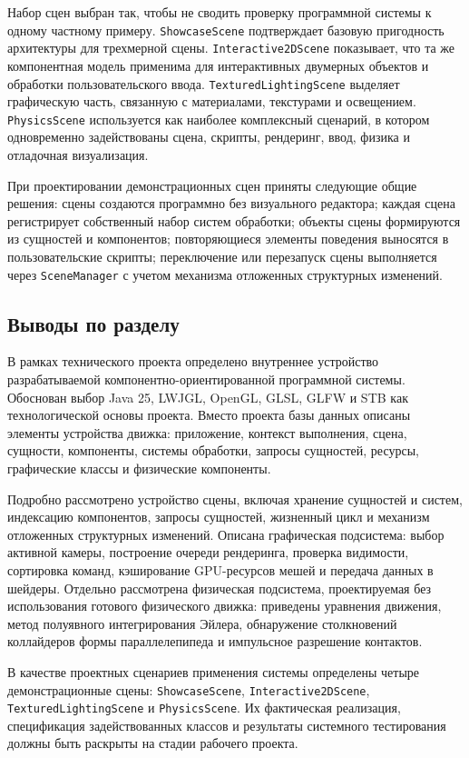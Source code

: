 Набор сцен выбран так, чтобы не сводить проверку программной системы к одному
частному примеру. \texttt{ShowcaseScene} подтверждает базовую пригодность
архитектуры для трехмерной сцены. \texttt{Interactive2DScene} показывает, что
та же компонентная модель применима для интерактивных двумерных объектов и
обработки пользовательского ввода. \texttt{TexturedLightingScene} выделяет
графическую часть, связанную с материалами, текстурами и освещением.
\texttt{PhysicsScene} используется как наиболее комплексный сценарий, в котором
одновременно задействованы сцена, скрипты, рендеринг, ввод, физика и отладочная
визуализация.

При проектировании демонстрационных сцен приняты следующие общие решения:
сцены создаются программно без визуального редактора; каждая сцена регистрирует
собственный набор систем обработки; объекты сцены формируются из сущностей и
компонентов; повторяющиеся элементы поведения выносятся в пользовательские
скрипты; переключение или перезапуск сцены выполняется через \texttt{SceneManager}
с учетом механизма отложенных структурных изменений.

\subsection{Выводы по разделу}

В рамках технического проекта определено внутреннее устройство разрабатываемой
компонентно-ориентированной программной системы. Обоснован выбор Java 25,
LWJGL, OpenGL, GLSL, GLFW и STB как технологической основы проекта. Вместо
проекта базы данных описаны элементы устройства движка: приложение, контекст
выполнения, сцена, сущности, компоненты, системы обработки, запросы сущностей,
ресурсы, графические классы и физические компоненты.

Подробно рассмотрено устройство сцены, включая хранение сущностей и систем,
индексацию компонентов, запросы сущностей, жизненный цикл и механизм отложенных
структурных изменений. Описана графическая подсистема: выбор активной камеры,
построение очереди рендеринга, проверка видимости, сортировка команд, кэширование
GPU-ресурсов мешей и передача данных в шейдеры. Отдельно рассмотрена физическая
подсистема, проектируемая без использования готового физического движка:
приведены уравнения движения, метод полуявного интегрирования Эйлера,
обнаружение столкновений коллайдеров формы параллелепипеда и импульсное
разрешение контактов.

В качестве проектных сценариев применения системы определены четыре
демонстрационные сцены: \texttt{ShowcaseScene}, \texttt{Interactive2DScene},
\texttt{TexturedLightingScene} и \texttt{PhysicsScene}. Их фактическая реализация,
спецификация задействованных классов и результаты системного тестирования должны
быть раскрыты на стадии рабочего проекта.

